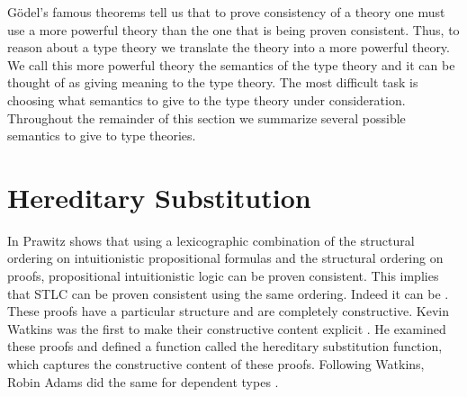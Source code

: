 G\"odel's famous theorems tell us that to prove consistency of a
theory one must use a more powerful theory than the one that is being
proven consistent.  Thus, to reason about a type theory we translate
the theory into a more powerful theory.  We call this more powerful
theory the semantics of the type theory and it can be thought of as
giving meaning to the type theory.  The most difficult task is
choosing what semantics to give to the type theory under
consideration.  Throughout the remainder of this section we summarize
several possible semantics to give to type theories.  

\section{Hereditary Substitution}
\label{sec:hereditary_substitution}
In \cite{Prawitz:1965} Prawitz shows that using a lexicographic
combination of the structural ordering on intuitionistic propositional
formulas and the structural ordering on proofs, propositional
intuitionistic logic can be proven consistent.  This implies that STLC
can be proven consistent using the same ordering.  Indeed it can be
\cite{Girard:1989,Amadio:1998,Levy:1976}.  These proofs have a
particular structure and are completely constructive.  Kevin Watkins
was the first to make their constructive content explicit
\cite{Watkins:2004}.  He examined these proofs and defined a function
called the hereditary substitution function, which captures the
constructive content of these proofs.  Following Watkins, Robin Adams
did the same for dependent types \cite{Adams:2004}.

